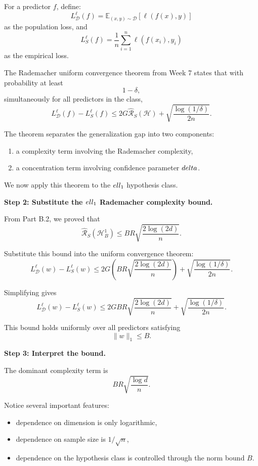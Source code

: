 \documentclass[11pt]{article}
\newcommand{\E}{\mathbb{E}}
\begin{document}
\begin{enumerate}
\begin{solutionbox}
For a predictor $f$, define:
\[
L_{\mathcal D}^\ell(f)
=
\E_{(x,y)\sim\mathcal D}
[\ell(f(x),y)]
\]
as the population loss, and
\[
L_S^\ell(f)
=
\frac1n
\sum_{i=1}^n
\ell(f(x_i),y_i)
\]
as the empirical loss.

The Rademacher uniform convergence theorem from Week 7 states that with probability at least
\[
1-\delta,
\]
simultaneously for all predictors in the class,
\[
L_{\mathcal D}^\ell(f)
-
L_S^\ell(f)
\le
2G
\widehat{\mathcal R}_S(\mathcal H)
+
\sqrt{
\frac{\log(1/\delta)}{2n}
}.
\]

The theorem separates the generalization gap into two components:
\begin{enumerate}
    \item a complexity term involving the Rademacher complexity,
    \item a concentration term involving confidence parameter $\\delta$.
\end{enumerate}

We now apply this theorem to the $\\ell_1$ hypothesis class.

\medskip

\textbf{Step 2: Substitute the $\\ell_1$ Rademacher complexity bound.}

From Part B.2, we proved that
\[
\widehat{\mathcal R}_S(\mathcal H_B^1)
\le
BR
\sqrt{
\frac{2\log(2d)}{n}
}.
\]

Substitute this bound into the uniform convergence theorem:
\[
L_{\mathcal D}^\ell(w)
-
L_S^\ell(w)
\le
2G
\left(
BR
\sqrt{
\frac{2\log(2d)}{n}
}
\right)
+
\sqrt{
\frac{\log(1/\delta)}{2n}
}.
\]

Simplifying gives
\[
\boxed{
L_{\mathcal D}^\ell(w)
-
L_S^\ell(w)
\le
2GBR
\sqrt{
\frac{2\log(2d)}{n}
}
+
\sqrt{
\frac{\log(1/\delta)}{2n}
}.
}
\]

This bound holds uniformly over all predictors satisfying
\[
\|w\|_1\le B.
\]

\medskip

\textbf{Step 3: Interpret the bound.}

The dominant complexity term is
\[
BR
\sqrt{
\frac{\log d}{n}
}.
\]

Notice several important features:
\begin{itemize}
    \item dependence on dimension is only logarithmic,
    \item dependence on sample size is $1/\sqrt n$,
    \item dependence on the hypothesis class is controlled through the norm bound $B$.
\end{itemize}


\end{solutionbox}
\end{enumerate}
\end{document}
